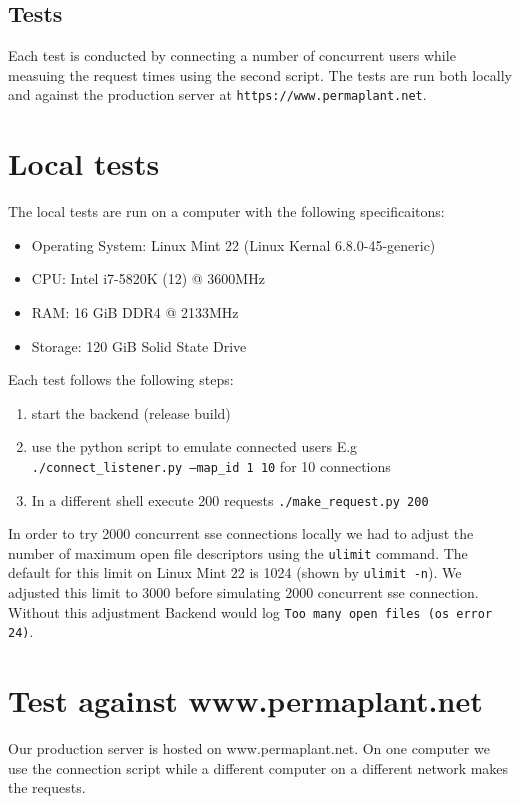 \documentclass[final,draft,oneside]{vutinfth}
\begin{document}
\subsection{Tests}

Each test is conducted by connecting a number of concurrent users while measuing the request times using the second script. The tests are run both locally and against the production server at \texttt{https://www.permaplant.net}.

\section{Local tests}

The local tests are run on a computer with the following specificaitons:
\begin{itemize}
  \item Operating System: Linux Mint 22 (Linux Kernal 6.8.0-45-generic)
  \item CPU: Intel i7-5820K (12) @ 3600MHz
  \item RAM: 16 GiB DDR4 @ 2133MHz
  \item Storage: 120 GiB Solid State Drive
\end{itemize}

Each test follows the following steps:
\begin{enumerate}
    \item start the backend (release build)
    \item use the python script to emulate connected users
    E.g \texttt{./connect\_listener.py --map\_id 1 10} for 10 connections
    \item In a different shell execute 200 requests \texttt{./make\_request.py 200}
\end{enumerate}

In order to try 2000 concurrent \gls{sse} connections locally we had to adjust the number of maximum open file descriptors using the \texttt{ulimit} command.
The default for this limit on Linux Mint 22 is 1024 (shown by \texttt{ulimit -n}).
We adjusted this limit to 3000 before simulating 2000 concurrent \gls{sse} connection.
Without this adjustment Backend would log \texttt{Too many open files (os error 24)}.

\section{Test against www.permaplant.net}

Our production server is hosted on www.permaplant.net.
On one computer we use the connection script while a different computer on a different network makes the requests.
\end{document}
